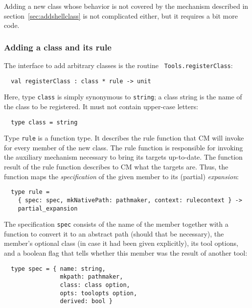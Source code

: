 Adding a new class whose behavior is not covered by the mechanism
described in section~\ref{sec:addshellclass} is not complicated
either, but it requires a bit more code.

\subsubsection{Adding a class and its rule}

The interface to add arbitrary classes is the routine {\tt
Tools.registerClass}:

\begin{verbatim}
  val registerClass : class * rule -> unit
\end{verbatim}

Here, type {\tt class} is simply synonymous to {\tt string}; a class
string is the name of the class to be registered.  It must not contain
upper-case letters:

\begin{verbatim}
  type class = string
\end{verbatim}

Type {\tt rule} is a function type.  It describes the rule function
that CM will invoke for every member of the new class. The rule
function is responsible for invoking the auxiliary mechanism necessary
to bring its targets up-to-date.  The function result of the rule
function describes to CM what the targets are.  Thus, the function
maps the {\em specification} of the given member to its (partial) {\em
expansion}:

\begin{verbatim}
  type rule =
    { spec: spec, mkNativePath: pathmaker, context: rulecontext } ->
    partial_expansion
\end{verbatim}

The specification {\tt spec} consists of the name of the member
together with a function to convert it to an abstract path (should
that be necessary), the member's optional class (in case it had been
given explicitly), its tool options, and a boolean flag that tells
whether this member was the result of another tool:

\begin{verbatim}
  type spec = { name: string,
                mkpath: pathmaker,
                class: class option,
                opts: toolopts option,
                derived: bool }
\end{verbatim}


